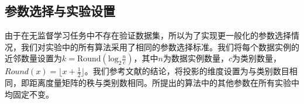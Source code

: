 \begin{itemize}
\subsection{参数选择与实验设置}
由于在无监督学习任务中不存在验证数据集，所以为了实现更一般化的参数选择情况，我们对实验中的所有算法采用了相同的参数选择标准。我们将每个数据实例的近邻数量设置为$k = \mathrm{Round}(\mathrm{log}_2\frac{n}{c})$，其中$n$为数据实例数量，$c$为类别数量，$Round(x)=\lfloor x+\frac{1}{2}\rfloor$。我们参考文献\parencite{ng2002spectral}的结论，将投影的维度设置为与类别数目相同，即距离度量矩阵的秩与类别数相同。所提出的算法中的其他参数在所有实验中均固定不变。


\end{itemize}
